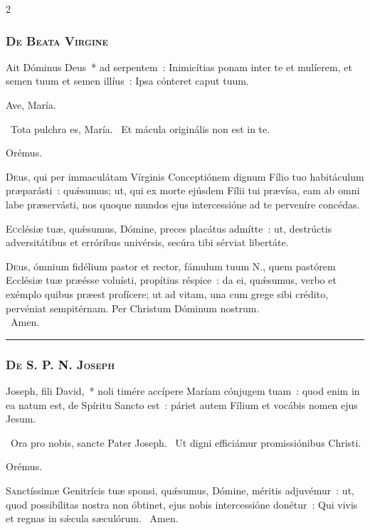 \documentclass[9pt,twoside]{extarticle}
\begin{document}
\begin{multicols}{2}
\subsubsection*{\center \textsc{De Beata Virgine}}
\begin{tightlist}{}
\item {} Ait Dóminus Deus~* ad serpentem~: Inimicítias ponam inter te et mulíerem, et semen tuum et semen illíus~: Ipsa cónteret caput tuum.
\item {\small {} Ave, María.}
\item {}~Tota pulchra es, María. ~Et mácula originális non est in te.
\item Orémus. \hfill {}
\end{tightlist}
\lettrine{D}eus, qui per immaculátam Vírginis Conceptiónem dignum Fílio tuo habitáculum præparásti~: quǽsumus; ut, qui ex morte ejúsdem Fílii tui prævísa, eam ab omni labe præservásti, nos quoque mundos ejus intercessióne ad te perveníre concédas.

\lettrine{E}cclésiæ tuæ, quǽsumus, Dómine, preces placátus admítte~: ut, destrúctis adversitátibus et erróribus univérsis, secúra tibi sérviat libertáte.

\lettrine{D}eus, ómnium fidélium pastor et rector, fámulum tuum N., quem pastórem Ecclésiæ tuæ præésse voluísti, propítius réspice~: da ei, quǽsumus, verbo et exémplo quibus præest profícere; ut ad vitam, una cum grege sibi crédito, pervéniat sempitérnam. Per Christum Dóminum nostrum.\\
~Amen.

\begin{center}\textcolor{red}{\rule{\linewidth}{0.5pt}} \end{center}

\subsubsection*{\center \textsc{De S. P. N. Joseph}}
\begin{tightlist}{}
\item {} Joseph, fili David,~* noli timére accípere Maríam cónjugem tuam~: quod enim in ea natum est, de Spíritu Sancto est~: páriet autem Fílium et vocábis nomen ejus Jesum.
\item {}~Ora pro nobis, sancte Pater Joseph. ~Ut digni efficiámur promissiónibus Christi.
\item Orémus. \hfill {}
\end{tightlist}
\lettrine{S}anctíssimæ Genitrícis tuæ sponsi, quǽsumus, Dómine, méritis adjuvémur~: ut, quod possibílitas nostra non óbtinet, ejus nobis intercessióne donétur~: Qui vivis et regnas in sǽcula sæculórum. ~Amen.


\end{multicols}
\end{document}
